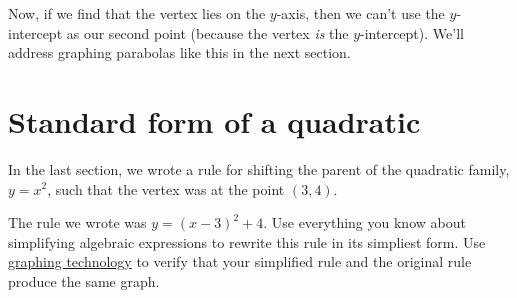 \begin{figure}
\end{figure}

Now, if we find that the vertex lies on the $y$-axis, then we can't use the $y$-intercept as our second point (because the vertex \textit{is} the $y$-intercept). We'll address graphing parabolas like this in the next section.


\section{Standard form of a quadratic}
\label{sec:standardformquad}

\begin{boxexplore}
In the last section, we wrote a rule for shifting the parent of the quadratic family, $y=x^2$, such that the vertex was at the point $(3, 4)$.

\begin{center}
\end{center}

The rule we wrote was $y=(x-3)^2 + 4$. Use everything you know about simplifying algebraic expressions to rewrite this rule in its simpliest form. Use \href{https://www.desmos.com/}{graphing technology} to verify that your simplified rule and the original rule produce the same graph.
\end{boxexplore}


